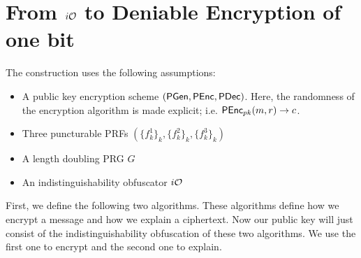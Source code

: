 \section{From $i\mathcal{O}$ to Deniable Encryption of one bit}


The construction uses the following assumptions:
\begin{itemize}
\item A public key encryption scheme $(\mathsf{PGen},\mathsf{PEnc},\mathsf{PDec})$. Here, the randomness of the encryption algorithm is made explicit; i.e. $\mathsf{PEnc}_{pk}(m,r)\to c$.
\item Three puncturable PRFs $(\{f_k^1\}_k,\{f_k^2\}_k,\{f_k^3\}_k)$
\item A length doubling PRG $G$
\item An indistinguishability obfuscator $i\mathcal{O}$
\end{itemize}

First, we define the following two algorithms. These algorithms define how we encrypt a message and how we explain a ciphertext. Now our public key will just consist of the indistinguishability obfuscation of these two algorithms. We use the first one to encrypt and the second one to explain.

\begin{figure}[h]
\centering
{}
\end{figure}

